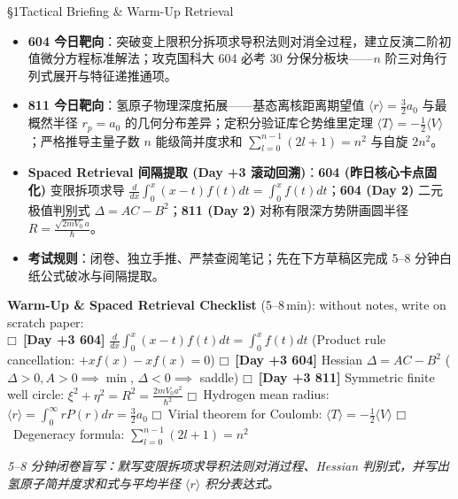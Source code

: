\documentclass[a4paper,11pt]{article}
\newcommand{\checkbox}{\ensuremath{\mdlgwhtsquare}}
\newcommand{\alerttag}[1]{\textcolor{wine}{\sffamily\bfseries [#1]}}
\begin{document}
\begin{briefing}{\S 1\quad Tactical Briefing \& Warm-Up Retrieval}
\begin{itemize}[leftmargin=1.5em, itemsep=2pt, topsep=1pt]
  \item \textbf{604 今日靶向}：突破变上限积分拆项求导积法则对消全过程，建立反演二阶初值微分方程标准解法；攻克国科大 604 必考 30 分保分板块——$n$ 阶三对角行列式展开与特征递推通项。
  \item \textbf{811 今日靶向}：氢原子物理深度拓展——基态离核距离期望值 $\langle r \rangle = \frac{3}{2}a_0$ 与最概然半径 $r_p = a_0$ 的几何分布差异；定积分验证库仑势维里定理 $\langle T \rangle = -\frac{1}{2}\langle V \rangle$；严格推导主量子数 $n$ 能级简并度求和 $\sum_{l=0}^{n-1}(2l+1)=n^2$ 与自旋 $2n^2$。
  \item \textbf{Spaced Retrieval 间隔提取 (Day +3 滚动回溯)}：\textbf{604 (昨日核心卡点固化)} 变限拆项求导 $\frac{d}{dx}\int_0^x (x-t)f(t)dt = \int_0^x f(t)dt$；\textbf{604 (Day 2)} 二元极值判别式 $\Delta = AC - B^2$；\textbf{811 (Day 2)} 对称有限深方势阱画圆半径 $R = \frac{\sqrt{2mV_0}a}{\hbar}$。
  \item \textbf{考试规则}：闭卷、独立手推、严禁查阅笔记；先在下方草稿区完成 5--8 分钟白纸公式破冰与间隔提取。
\end{itemize}

\vspace{1mm}
\textbf{Warm-Up \& Spaced Retrieval Checklist} (5--8\,min): without notes, write on scratch paper:\\
\checkbox\ \alerttag{Day +3 604} $\frac{d}{dx}\int_0^x (x-t)f(t)dt = \int_0^x f(t)dt$ (Product rule cancellation: $+xf(x) - xf(x) = 0$)\quad
\checkbox\ \alerttag{Day +3 604} Hessian $\Delta = AC - B^2$ ($\Delta>0, A>0 \implies \min$, $\Delta<0 \implies$ saddle) \quad
\checkbox\ \alerttag{Day +3 811} Symmetric finite well circle: $\xi^2+\eta^2 = R^2 = \frac{2mV_0 a^2}{\hbar^2}$ \quad
\checkbox\ Hydrogen mean radius: $\langle r \rangle = \int_0^\infty r P(r)dr = \frac{3}{2}a_0$ \quad
\checkbox\ Virial theorem for Coulomb: $\langle T \rangle = -\frac{1}{2}\langle V \rangle$ \quad
\checkbox\ Degeneracy formula: $\sum_{l=0}^{n-1} (2l+1) = n^2$
\end{briefing}

\vspace{4pt}

\begin{tcolorbox}[
  enhanced, colback=white, colframe=border, boxrule=0.6pt, arc=2mm,
  left=4mm, right=4mm, top=3mm, bottom=3mm,
  fonttitle=\sffamily\bfseries\color{slate},
  title={\raisebox{0pt}{\color{royal}\rule{3pt}{10pt}}\hspace{4pt}Warm-Up Retrieval Workspace \textbar\ 白纸破冰与间隔提取草稿区},
  colbacktitle=paper, coltitle=slate,
  titlerule=0pt, toptitle=2mm, bottomtitle=2mm
]
\textcolor{mist}{\footnotesize\itshape 5--8 分钟闭卷盲写：默写变限拆项求导积法则对消过程、Hessian 判别式，并写出氢原子简并度求和式与平均半径 $\langle r \rangle$ 积分表达式。}
\vspace{9.0cm}
\end{tcolorbox}
\end{document}
